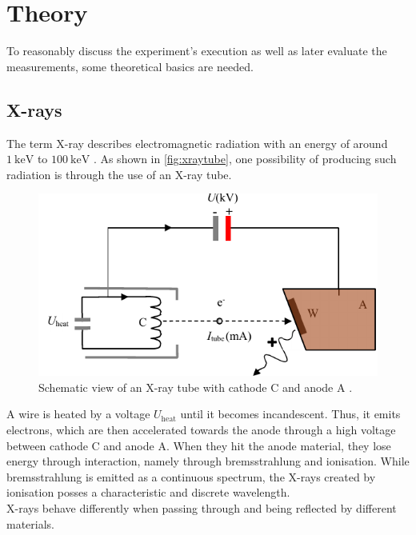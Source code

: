 \section{Theory}
\label{sec:theorie}

To reasonably discuss the experiment's execution as well as later evaluate the measurements, some theoretical basics are needed.

\subsection{X-rays}

The term X-ray describes electromagnetic radiation with an energy of around $\SI{1}{\kilo\eV}$ to $\SI{100}{\kilo\eV}$ \cite{gamma}.
As shown in \autoref{fig:xraytube}, one possibility of producing such radiation is through the use of an X-ray tube.

\begin{figure}[H]
    \centering
    \includegraphics{figures/x-ray_tube.pdf}
    \caption{Schematic view of an X-ray tube with cathode C and anode A \cite{xraytube}.}
    \label{fig:xraytube}
\end{figure}

A wire is heated by a voltage $U_\text{heat}$ until it becomes incandescent.
Thus, it emits electrons, which are then accelerated towards the anode through a high voltage between cathode C and anode A.
When they hit the anode material, they lose energy through interaction, namely through bremsstrahlung and ionisation.
While bremsstrahlung is emitted as a continuous spectrum, the X-rays created by ionisation posses a characteristic and discrete wavelength. \\

X-rays behave differently when passing through and being reflected by different materials.

